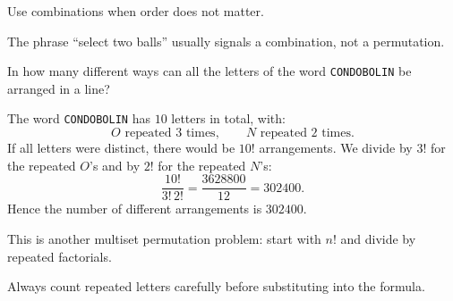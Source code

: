 \begin{takeaways}
\item Use combinations when order does not matter.
\item The phrase ``select two balls'' usually signals a combination, not a permutation.
\end{takeaways}

\begin{problem}
In how many different ways can all the letters of the word \texttt{CONDOBOLIN} be arranged in a line?
\end{problem}

\begin{solution}
The word \texttt{CONDOBOLIN} has $10$ letters in total, with:
\[
O \text{ repeated } 3 \text{ times}, \qquad N \text{ repeated } 2 \text{ times}.
\]
If all letters were distinct, there would be $10!$ arrangements. We divide by $3!$ for the repeated $O$'s and by $2!$ for the repeated $N$'s:
\[
\frac{10!}{3!\,2!}=\frac{3628800}{12}=302400.
\]
Hence the number of different arrangements is $\boxed{302400}$.
\end{solution}

\begin{takeaways}
\item This is another multiset permutation problem: start with $n!$ and divide by repeated factorials.
\item Always count repeated letters carefully before substituting into the formula.
\end{takeaways}
